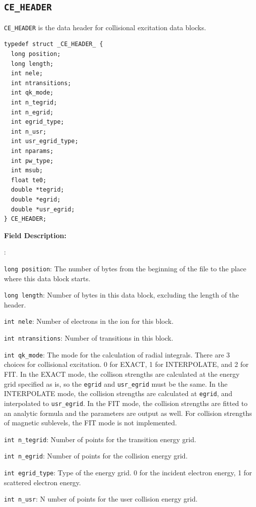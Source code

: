 \documentclass[twoside,letterpaper]{refrep}
\newenvironment{dbdesc}{\textbf{Field Description:} \begin{list}
	{:}{\setlength{\labelwidth}{2in}
	   \setlength{\leftmargin}{2in}
	   \setlength{\labelsep}{0.1in}
	   \setlength{\rightmargin}{0.2in}}}
	{\end{list}}
\begin{document}
\subsection{\texttt{CE\_HEADER}}
\texttt{CE\_HEADER} is the data header for collisional excitation data blocks.

\begin{verbatim}
typedef struct _CE_HEADER_ {
  long position;
  long length;
  int nele;
  int ntransitions;
  int qk_mode;
  int n_tegrid;
  int n_egrid;
  int egrid_type;
  int n_usr;
  int usr_egrid_type;
  int nparams;
  int pw_type;
  int msub;
  float te0;
  double *tegrid;
  double *egrid;
  double *usr_egrid;
} CE_HEADER;
\end{verbatim}

\begin{dbdesc}
\item[\texttt{long position}:] The number of bytes from the beginning of the
file to the place where this data block starts.
\item[\texttt{long length}:] Number of bytes in this data block, excluding the
length of the header.
\item[\texttt{int nele}:] Number of electrons in the ion for this block.
\item[\texttt{int ntransitions}:] Number of transitions in this block.
\item[\texttt{int qk\_mode}:] The mode for the calculation of radial
integrals. There are 3 choices for collisional excitation. 0 for EXACT, 1 for
INTERPOLATE, and 2 for FIT. In the EXACT mode, the collison strengths are
calculated at the energy grid specified as is, so the \texttt{egrid} and
\texttt{usr\_egrid} must be the same. In the INTERPOLATE mode, the collision
strengths are calculated at \texttt{egrid}, and interpolated to
\texttt{usr\_egrid}. In the FIT mode, the collision strengths are fitted to an
analytic formula and the parameters are output as well. For collision
strengths of magnetic sublevels, the FIT mode is not implemented.
\item[\texttt{int n\_tegrid}:] Number of points for the transition energy grid.
\item[\texttt{int n\_egrid}:] Number of points for the collision energy grid.
\item[\texttt{int egrid\_type}:] Type of the energy grid. 0 for the incident
electron energy, 1 for scattered electron energy.
\item[\texttt{int n\_usr}:]N umber of points for the user collision energy
grid.

\end{dbdesc}
\end{document}

